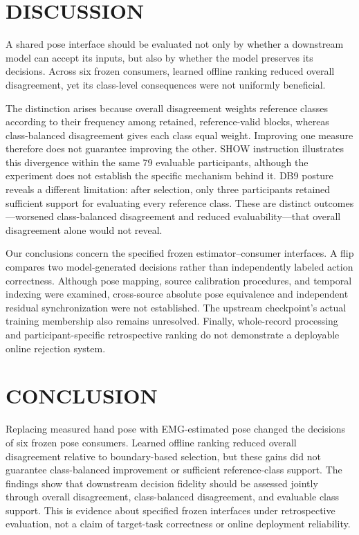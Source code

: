 \section{DISCUSSION}\label{discussion}
A shared pose interface should be evaluated not only by whether a downstream model can accept its inputs, but also by whether the model preserves its decisions. Across six frozen consumers, learned offline ranking reduced overall disagreement, yet its class-level consequences were not uniformly beneficial.

The distinction arises because overall disagreement weights reference classes according to their frequency among retained, reference-valid blocks, whereas class-balanced disagreement gives each class equal weight. Improving one measure therefore does not guarantee improving the other. SHOW instruction illustrates this divergence within the same 79 evaluable participants, although the experiment does not establish the specific mechanism behind it. DB9 posture reveals a different limitation: after selection, only three participants retained sufficient support for evaluating every reference class. These are distinct outcomes---worsened class-balanced disagreement and reduced evaluability---that overall disagreement alone would not reveal.

Our conclusions concern the specified frozen estimator--consumer interfaces. A flip compares two model-generated decisions rather than independently labeled action correctness. Although pose mapping, source calibration procedures, and temporal indexing were examined, cross-source absolute pose equivalence and independent residual synchronization were not established. The upstream checkpoint's actual training membership also remains unresolved. Finally, whole-record processing and participant-specific retrospective ranking do not demonstrate a deployable online rejection system.

\section{CONCLUSION}\label{conclusion}
Replacing measured hand pose with EMG-estimated pose changed the decisions of six frozen pose consumers. Learned offline ranking reduced overall disagreement relative to boundary-based selection, but these gains did not guarantee class-balanced improvement or sufficient reference-class support. The findings show that downstream decision fidelity should be assessed jointly through overall disagreement, class-balanced disagreement, and evaluable class support. This is evidence about specified frozen interfaces under retrospective evaluation, not a claim of target-task correctness or online deployment reliability.

